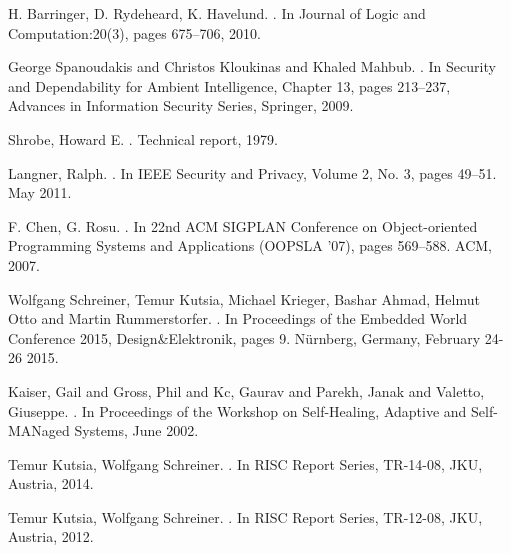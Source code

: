 \documentclass[conference]{IEEEtran}
\begin{document}
\begin{thebibliography}{1}
{H. Barringer, D. Rydeheard, K. Havelund}.
.
\newblock In {Journal of Logic and Computation:20(3)}, pages 675--706, 2010.


{George Spanoudakis and
               Christos Kloukinas and
               Khaled Mahbub}.
.
\newblock In {Security and Dependability for Ambient Intelligence}, Chapter 13, pages 213--237, Advances in Information Security Series, Springer, 2009.



{Shrobe, Howard E}.
.
\newblock Technical report, 1979.

{Langner, Ralph}.
.
\newblock In {IEEE Security and Privacy, Volume 2, No. 3}, pages 49--51. May 2011.

{F. Chen, G. Rosu}.
.
\newblock In {22nd ACM SIGPLAN Conference on Object-oriented Programming Systems and Applications (OOPSLA ’07)}, pages 569--588. ACM, 2007.

{Wolfgang Schreiner, Temur Kutsia, Michael Krieger, Bashar Ahmad, Helmut Otto and Martin Rummerstorfer}.
.
\newblock In {Proceedings of the Embedded World Conference 2015}, Design\&Elektronik, pages 9. N\"urnberg, Germany, February 24-26 2015.

{Kaiser, Gail and Gross, Phil and Kc, Gaurav and Parekh, Janak and Valetto, Giuseppe}.
.
\newblock In {Proceedings of the Workshop on Self-Healing, Adaptive and Self-MANaged Systems}, June 2002.



{Temur Kutsia, Wolfgang Schreiner}.
.
\newblock In {RISC Report Series, TR-14-08}, JKU, Austria, 2014.

{Temur Kutsia, Wolfgang Schreiner}.
.
\newblock In {RISC Report Series, TR-12-08}, JKU, Austria, 2012.


\end{thebibliography}
\end{document}

